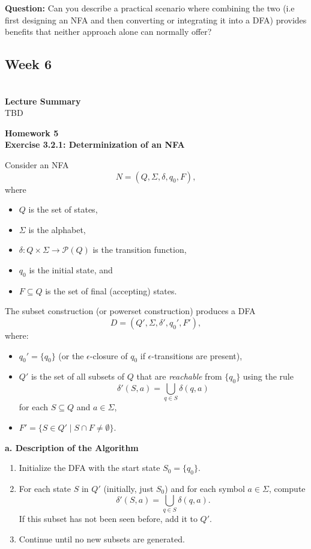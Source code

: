 \documentclass{article}
\theoremstyle{theorem}
\theoremstyle{definition}
\theoremstyle{remark}
\begin{document}
\textbf{Question:} Can you describe a practical scenario where combining the two (i.e  first designing an NFA and then converting or integrating it into a DFA) provides benefits that neither approach alone can normally offer?

\subsection{\textbf{Week 6}}\\
\textbf{Lecture Summary}\\
TBD

\textbf{Homework 5}\\
\textbf{Exercise 3.2.1: Determinization of an NFA}

Consider an NFA 
\[
N = (Q,\Sigma,\delta,q_0,F),
\]
where 
\begin{itemize}
    \item \(Q\) is the set of states,
    \item \(\Sigma\) is the alphabet,
    \item \(\delta : Q \times \Sigma \to \mathcal{P}(Q)\) is the transition function,
    \item \(q_0\) is the initial state, and
    \item \(F \subseteq Q\) is the set of final (accepting) states.
\end{itemize}

The subset construction (or powerset construction) produces a DFA 
\[
D = (Q', \Sigma, \delta', q_0', F'),
\]
where:
\begin{itemize}
    \item \(q_0' = \{q_0\}\) (or the \(\epsilon\)-closure of \(q_0\) if \(\epsilon\)-transitions are present),
    \item \(Q'\) is the set of all subsets of \(Q\) that are \emph{reachable} from \(\{q_0\}\) using the rule
    \[
      \delta'(S, a) = \bigcup_{q\in S} \delta(q,a)
    \]
    for each \(S \subseteq Q\) and \(a\in\Sigma\),
    \item \(F' = \{ S \in Q' \mid S\cap F \neq \emptyset \}\).
\end{itemize}

\textbf{a. Description of the Algorithm}

\begin{enumerate}
  \item Initialize the DFA with the start state \(S_0 = \{q_0\}\).
  \item For each state \(S\) in \(Q'\) (initially, just \(S_0\)) and for each symbol \(a \in \Sigma\), compute
  \[
    \delta'(S,a)= \bigcup_{q\in S} \delta(q,a).
  \]
  If this subset has not been seen before, add it to \(Q'\).
  \item Continue until no new subsets are generated.
\end{enumerate}
\end{document}

